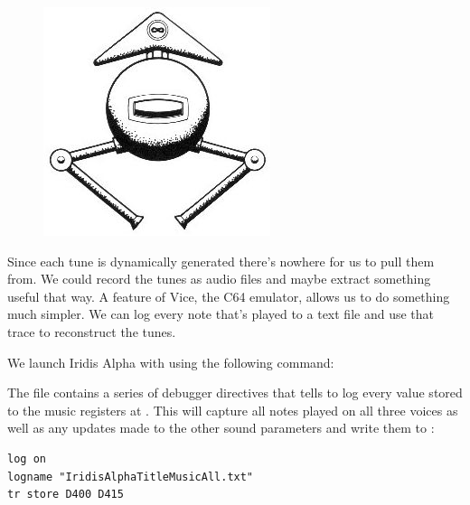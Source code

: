 \begin{definition}
\setlength{\intextsep}{0pt}%
\setlength{\columnsep}{3pt}%
\begin{figure}
\includegraphics[width=\linewidth]{src/callout/ia.jpg} 
\end{figure}
\small
Since each tune is dynamically generated there's nowhere for us to pull them from. We could record
the tunes as audio files and maybe extract something useful that way. A feature of Vice, the C64
emulator, allows us to do something much simpler. We can log every note that's played to a 
text file and use that trace to reconstruct the tunes.

We launch Iridis Alpha with  using the following command:


The  file contains a series of debugger directives that tells 
to log every value stored to the music registers at . This will capture
all notes played on all three voices as well as any updates made to the other sound parameters
and write them to :

\begin{lstlisting}[escapechar=\%]
log on
logname "IridisAlphaTitleMusicAll.txt"
tr store D400 D415
\end{lstlisting}


\end{definition}
